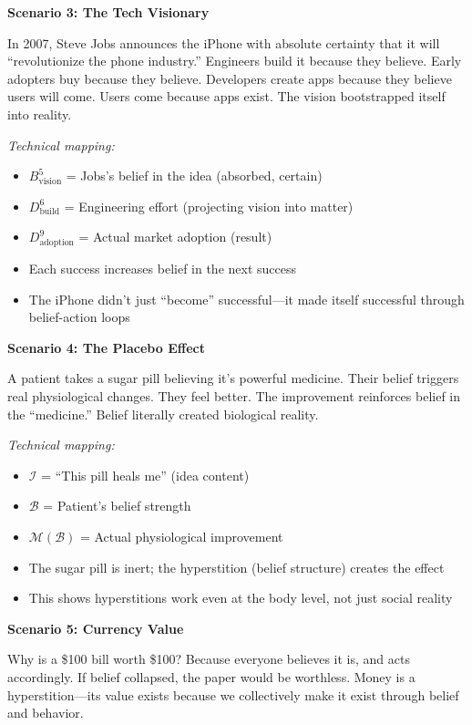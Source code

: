 \documentclass[11pt,twoside]{book}
\begin{document}
\begin{tcolorbox}[colback=yellow!5!white,colframe=yellow!65!black,title=\textbf{Real-Life Scenarios: Hyperstitions},breakable]
\textbf{Scenario 3: The Tech Visionary}

In 2007, Steve Jobs announces the iPhone with absolute certainty that it will ``revolutionize the phone industry.'' Engineers build it because they believe. Early adopters buy because they believe. Developers create apps because they believe users will come. Users come because apps exist. The vision bootstrapped itself into reality.

\textit{Technical mapping:}
\begin{itemize}
    \item $B^5_{\mathrm{vision}}$ = Jobs's belief in the idea (absorbed, certain)
    \item $D^6_{\mathrm{build}}$ = Engineering effort (projecting vision into matter)
    \item $D^9_{\mathrm{adoption}}$ = Actual market adoption (result)
    \item Each success increases belief in the next success
    \item The iPhone didn't just ``become'' successful---it made itself successful through belief-action loops
\end{itemize}

\textbf{Scenario 4: The Placebo Effect}

A patient takes a sugar pill believing it's powerful medicine. Their belief triggers real physiological changes. They feel better. The improvement reinforces belief in the ``medicine.'' Belief literally created biological reality.

\textit{Technical mapping:}
\begin{itemize}
    \item $\mathcal{I}$ = ``This pill heals me'' (idea content)
    \item $\mathcal{B}$ = Patient's belief strength
    \item $\mathcal{M}(\mathcal{B})$ = Actual physiological improvement
    \item The sugar pill is inert; the hyperstition (belief structure) creates the effect
    \item This shows hyperstitions work even at the body level, not just social reality
\end{itemize}

\textbf{Scenario 5: Currency Value}

Why is a \$100 bill worth \$100? Because everyone believes it is, and acts accordingly. If belief collapsed, the paper would be worthless. Money is a hyperstition---its value exists because we collectively make it exist through belief and behavior.


\end{tcolorbox}
\end{document}
